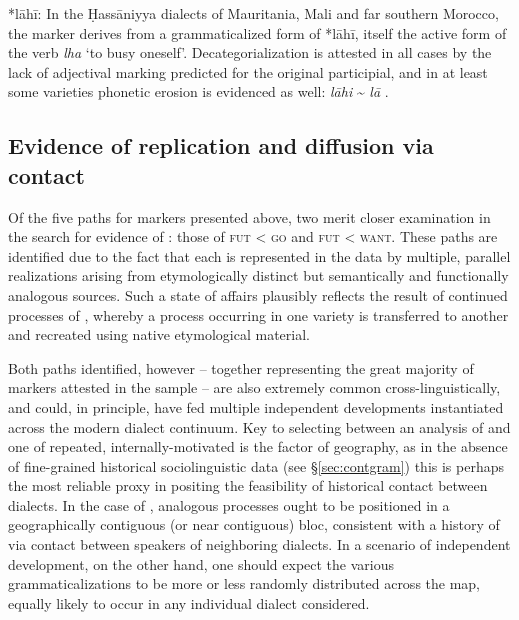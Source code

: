 \documentclass[output=paper]{langsci/langscibook}
\begin{document}
\begin{altdescription}
\item[*{lāhī}:]
In the Ḥassāniyya dialects of Mauritania, Mali and far southern Morocco, the   marker derives from a grammaticalized form of *lāhī, itself the active  form of the verb \textit{lha} ‘to busy oneself’. Decategorialization is attested in all cases by the lack of adjectival  marking predicted for the original participial, and in at least some varieties phonetic erosion is evidenced as well:  \textit{lāhi} {\textasciitilde} \textit{lā} \citep{Heath2003}.
\end{altdescription}

\subsection{Evidence of replication and diffusion via contact}\label{sec:repl}


Of the five  paths for   markers presented above, two merit closer examination in the search for evidence of : those of \textsc{fut} < \textsc{go} and \textsc{fut} < \textsc{want}. These paths are identified due to the fact that each is represented in the data by multiple, parallel realizations arising from etymologically distinct but semantically and functionally analogous sources. Such a state of affairs plausibly reflects the result of continued processes of , whereby a  process occurring in one  variety is transferred to another and recreated using native etymological material.

Both paths identified, however – together representing the great majority of   markers attested in the sample – are also extremely common cross-linguistically, and could, in principle, have fed multiple independent developments instantiated across the modern  dialect continuum. Key to selecting between an analysis of  and one of repeated, internally-motivated  is the factor of geography, as in the absence of fine-grained historical sociolinguistic data (see §\ref{sec:contgram}) this is perhaps the most reliable proxy in positing the feasibility of historical contact between dialects. In the case of , analogous  processes ought to be positioned in a geographically contiguous (or near contiguous) bloc, consistent with a history of  via contact between speakers of neighboring dialects. In a scenario of independent development, on the other hand, one should expect the various grammaticalizations to be more or less randomly distributed across the map, equally likely to occur in any individual dialect considered.
\end{document}
